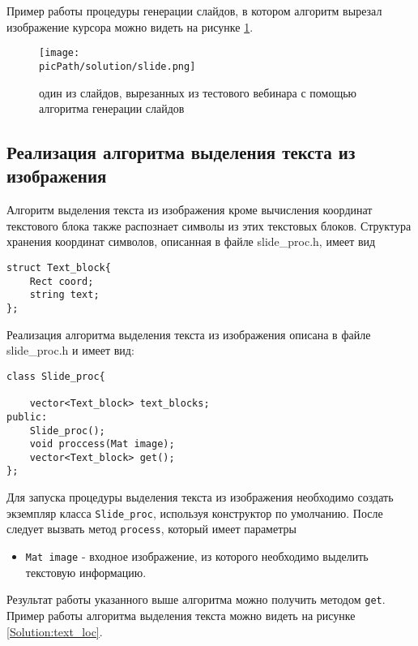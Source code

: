 \documentclass[oneside,final,14pt]{extreport}
\newcommand{\picPath}{pictures}
\begin{document}
Пример работы процедуры генерации слайдов, в котором алгоритм вырезал изображение курсора можно видеть на рисунке \ref{Solution:slide}.

\begin{figure}[H]
\begin{center}
\texttt{[image: \\picPath/solution/slide.png]}
\end{center}
  \caption{ один из слайдов, вырезанных из тестового вебинара с помощью алгоритма генерации слайдов}
  \label{Solution:slide}
\end{figure}

\subsection{Реализация алгоритма выделения текста из изображения}

Алгоритм выделения текста из изображения кроме вычисления координат текстового блока также распознает символы из этих текстовых блоков. Структура хранения координат символов, описанная в файле slide\_proc.h, имеет вид 
\begin{verbatim}
struct Text_block{
    Rect coord;
    string text;
};
\end{verbatim}

Реализация алгоритма выделения текста из изображения описана в файле slide\_proc.h и имеет вид:
 
\begin{verbatim}
class Slide_proc{

    vector<Text_block> text_blocks;
public:
    Slide_proc();
    void proccess(Mat image);
    vector<Text_block> get();
};
\end{verbatim}

Для запуска процедуры выделения текста из изображения необходимо создать экземпляр класса \verb!Slide_proc!, используя конструктор по умолчанию. После следует вызвать метод \verb!process!, который имеет параметры
\begin{itemize}
\item \verb!Mat image! - входное изображение, из которого необходимо выделить текстовую информацию.
\end{itemize}

Результат работы указанного выше алгоритма можно получить методом \verb!get!. Пример работы алгоритма выделения текста можно видеть на рисунке \ref{Solution:text_loc}. 
\end{document}
